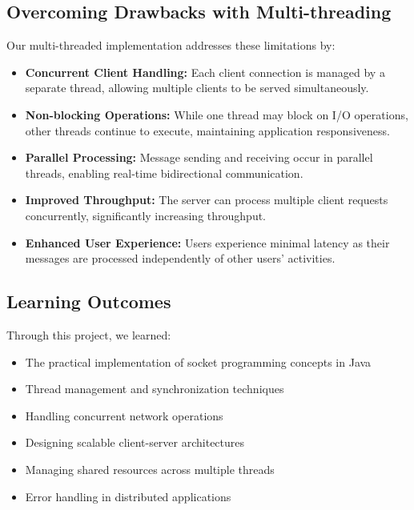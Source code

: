 \documentclass[12pt,a4paper]{article}
\begin{document}
\subsection{Overcoming Drawbacks with Multi-threading}
Our multi-threaded implementation addresses these limitations by:
\begin{itemize}
    \item \textbf{Concurrent Client Handling:} Each client connection is managed by a separate thread, allowing multiple clients to be served simultaneously.
    
    \item \textbf{Non-blocking Operations:} While one thread may block on I/O operations, other threads continue to execute, maintaining application responsiveness.
    
    \item \textbf{Parallel Processing:} Message sending and receiving occur in parallel threads, enabling real-time bidirectional communication.
    
    \item \textbf{Improved Throughput:} The server can process multiple client requests concurrently, significantly increasing throughput.
    
    \item \textbf{Enhanced User Experience:} Users experience minimal latency as their messages are processed independently of other users' activities.
\end{itemize}

\subsection{Learning Outcomes}
Through this project, we learned:
\begin{itemize}
    \item The practical implementation of socket programming concepts in Java
    \item Thread management and synchronization techniques
    \item Handling concurrent network operations
    \item Designing scalable client-server architectures
    \item Managing shared resources across multiple threads
    \item Error handling in distributed applications
\end{itemize}
\end{document}
